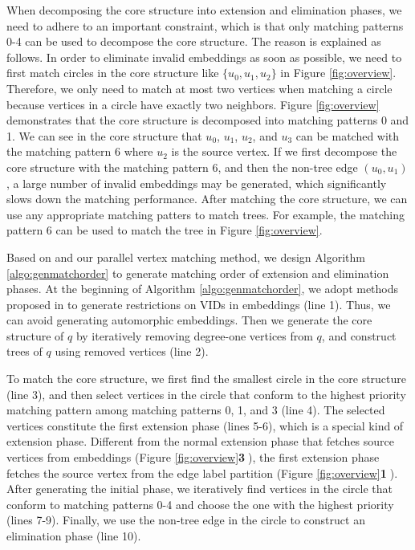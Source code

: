 When decomposing the core structure into extension and elimination phases, we need to adhere to an important constraint, which is that only matching patterns 0-4 can be used to decompose the core structure. The reason is explained as follows. In order to eliminate invalid embeddings as soon as possible, we need to first match circles in the core structure like $\{u_0, u_1, u_2\}$ in Figure \ref{fig:overview}. Therefore, we only need to match at most two vertices when matching a circle because vertices in a circle have exactly two neighbors. Figure \ref{fig:overview} demonstrates that the core structure is decomposed into matching patterns 0 and 1. We can see in the core structure that $u_0$, $u_1$, $u_2$, and $u_3$ can be matched with the matching pattern 6 where $u_2$ is the source vertex. If we first decompose the core structure with the matching pattern 6, and then the non-tree edge $(u_0, u_1)$, a large number of invalid embeddings may be generated, which significantly slows down the matching performance. After matching the core structure, we can use any appropriate matching patters to match trees. For example, the matching pattern 6 can be used to match the tree in Figure \ref{fig:overview}.


Based on \cite{bi2016efficient} and our parallel vertex matching method, we design Algorithm \ref{algo:genmatchorder} to generate matching order of extension and elimination phases. At the beginning of Algorithm \ref{algo:genmatchorder}, we adopt methods proposed in \cite{shi2020graphpi,mawhirter2019graphzero} to generate restrictions on VIDs in embeddings (line 1). Thus, we can avoid generating automorphic embeddings. Then we generate the core structure of $q$ by iteratively removing degree-one vertices from $q$, and construct trees of $q$ using removed vertices (line 2).

To match the core structure, we first find the smallest circle in the core structure (line 3), and then select vertices in the circle that
conform to the highest priority matching pattern among matching patterns 0, 1, and 3 (line 4). The selected vertices constitute the first
extension phase (lines 5-6), which is a special kind of extension phase. Different from the normal extension phase that fetches source
vertices from embeddings (Figure \ref{fig:overview}\textbf{\textcircled{3}}), the first extension phase fetches the source vertex from the
edge label partition (Figure \ref{fig:overview}\textbf{\textcircled{1}}). After generating the initial phase, we iteratively find vertices
in the circle that conform to matching patterns 0-4 and choose the one with the highest priority (lines 7-9). Finally, we use the non-tree
edge in the circle to construct an elimination phase (line 10).

